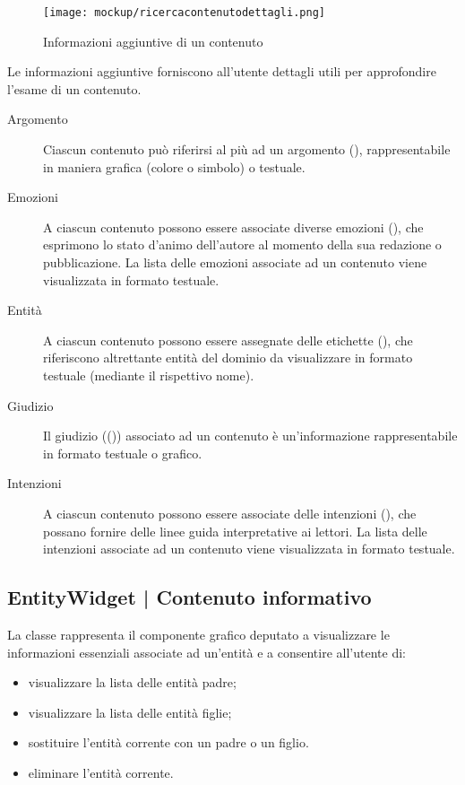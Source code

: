 \documentclass[10pt,a4paper,headinclude,footinclude,hidelinks]{scrreprt} %
\begin{document}
	\begin{figure}[ht]
		\begin{center}
	    	\texttt{[image: mockup/ricercacontenutodettagli.png]}
			\label{gfx:mockup:content-details}
			\caption{Informazioni aggiuntive di un contenuto}
		\end{center}
	\end{figure}

	Le informazioni aggiuntive forniscono all'utente dettagli utili per approfondire l'esame di un contenuto.
	\begin{description}
	\item[Argomento] Ciascun contenuto può riferirsi al più ad un argomento (\textit{}), rappresentabile in maniera grafica (colore o simbolo) o testuale.
	\item[Emozioni] A ciascun contenuto possono essere associate diverse emozioni (\textit{}), che esprimono lo stato d'animo dell'autore al momento della sua redazione o pubblicazione. La lista delle emozioni associate ad un contenuto viene visualizzata in formato testuale.
	\item[Entit\`a] A ciascun contenuto possono essere assegnate delle etichette (\textit{}), che riferiscono altrettante entità del dominio da visualizzare in formato testuale (mediante il rispettivo nome).
	\item[Giudizio] Il giudizio ((\textit{})) associato ad un contenuto è un'informazione rappresentabile in formato testuale o grafico.
	\item[Intenzioni] A ciascun contenuto possono essere associate delle intenzioni (\textit{}), che possano fornire delle linee guida interpretative ai lettori. La lista delle intenzioni associate ad un contenuto viene visualizzata in formato testuale.
	\end{description}

	\subsection[EntityWidget]{EntityWidget | Contenuto informativo}
	\label{sec:stage:design:sistema:view:entity-widget}
	La classe \textit{} rappresenta il componente grafico deputato a visualizzare le informazioni essenziali associate ad un'entità e a consentire all'utente di:
	\begin{itemize}
	\item visualizzare la lista delle entità padre;
	\item visualizzare la lista delle entità figlie;
	\item sostituire l'entità corrente con un padre o un figlio.
	\item eliminare l'entità corrente.
	\end{itemize}
\end{document}
